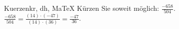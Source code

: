 \begin{MAufgabe}{Kuerzen}{kr, dh, MaTeX}
K\"urzen Sie soweit m\"oglich: $\frac{-658}{504}$.\\ 
\ifLsg\MLoesung
\quad $\frac{-658}{504}=\frac{(14)\cdot(-47)}{(14)\cdot(36)}=\frac{-47}{36}$.\else\relax\fi
 \end{MAufgabe}